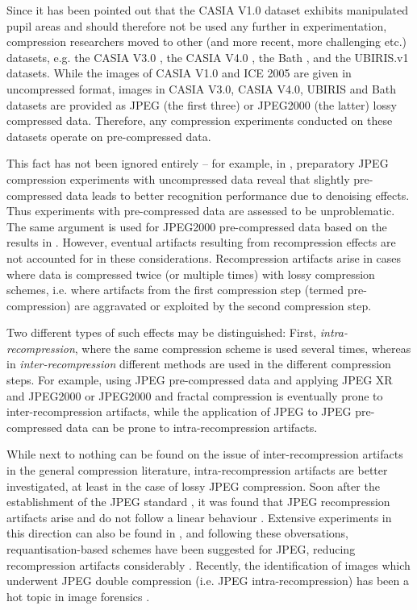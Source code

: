 \documentclass[10pt,twocolumn,letterpaper]{article}
\begin{document}
Since it has been pointed out \cite{BPhilips07a} that the CASIA V1.0 dataset exhibits manipulated pupil areas and should therefore not be used any further in experimentation, compression researchers moved to other (and more recent, more challenging etc.) datasets, e.g. 
	the CASIA V3.0 \cite{Horvath11b,Rathgeb12e}, 
	the CASIA V4.0 \cite{BTuba12a}, the Bath \cite{BIves08a,BPardamean12a}, and the UBIRIS.v1 \cite{Haemmerle09a,BCarneiro11a} datasets.
	While the images of CASIA V1.0 and ICE 2005 are given in uncompressed format, images in CASIA V3.0, CASIA V4.0, UBIRIS and Bath datasets are provided as JPEG (the first three) or JPEG2000 (the latter) lossy compressed data. Therefore, any compression experiments conducted on these datasets operate on pre-compressed data. 
	
	This fact has not been ignored entirely -- for example, in \cite{Rathgeb12e}, preparatory JPEG compression experiments with uncompressed data reveal that 
	slightly pre-compressed data leads to better recognition performance due to denoising effects. Thus experiments with pre-compressed data are assessed to
	be unproblematic. The same argument is used for JPEG2000 pre-compressed data \cite{BPardamean12a} based on the results in \cite{BIves08a}.
	However, eventual artifacts resulting from recompression effects are not accounted for in these considerations. Recompression artifacts arise in cases where	data is compressed twice (or multiple times) with lossy compression schemes, i.e. where artifacts from the first compression step (termed pre-compression)
	are aggravated or exploited by the second compression step.
	
	Two different types of such effects may be distinguished: First, \emph{intra-recompression}, where the same compression scheme is used several times, whereas
	in \emph{inter-recompression} different methods are used in the different compression steps. For example, using JPEG pre-compressed data and applying
	JPEG XR and JPEG2000 \cite{Horvath11b} or JPEG2000 and fractal compression \cite{BCarneiro11a} is eventually prone to inter-recompression
	artifacts, while the application of JPEG to JPEG pre-compressed data \cite{BTuba12a,Rathgeb12e} can be prone to intra-recompression artifacts.
	
	While next to nothing can be found on the issue of inter-recompression artifacts in the general compression literature, 
	intra-recompression artifacts are better investigated, at least in the case of lossy JPEG compression. Soon after the establishment of
	the JPEG standard \cite{Pennebaker93a}, it was found that JPEG recompression artifacts arise and do not follow a linear behaviour \cite{Chan92a}.
	Extensive experiments in this direction can also  be found in \cite{Kumar11a}, and following these obversations, requantisation-based schemes have been
	suggested for JPEG, reducing recompression artifacts considerably \cite{Bauschke03a}. Recently, the identification of images which underwent 
	JPEG double compression (i.e. JPEG intra-recompression) has been a hot topic in image forensics \cite{Sencar12a}.
	
\end{document}
